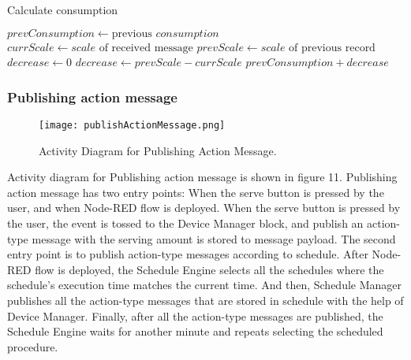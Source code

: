 \documentclass[conference]{IEEEtran}
\begin{document}
\begin{algorithm}
\caption{Calculate consumption}\label{algo}
\begin{algorithmic}[1]
        \State $prevConsumption \gets \text{previous } \textit{consumption}$
        \State $currScale \gets \textit{scale} \text{ of received message}$
        \State $prevScale \gets \textit{scale} \text{ of  previous record}$
        \State $decrease \gets 0$
            \State $decrease \gets prevScale - currScale$
        \EndIf
        \Return $prevConsumption + decrease$
    \EndProcedure
\end{algorithmic}
\end{algorithm}

\subsubsection{Publishing action message}
\begin{figure}[htbp]
\centerline{\texttt{[image: publishActionMessage.png]}}
\caption{Activity Diagram for Publishing Action Message.}
\label{fig}
\end{figure}
Activity diagram for Publishing action message is shown in figure 11. Publishing action message has two entry points: When the serve button is pressed by the user, and when Node-RED flow is deployed. When the serve button is pressed by the user, the event is tossed to the Device Manager block, and publish an action-type message with the serving amount is stored to message payload. The second entry point is to publish action-type messages according to schedule. After Node-RED flow is deployed, the Schedule Engine selects all the schedules where the schedule’s execution time matches the current time. And then, Schedule Manager publishes all the action-type messages that are stored in schedule with the help of Device Manager. Finally, after all the action-type messages are published, the Schedule Engine waits for another minute and repeats selecting the scheduled procedure.

\hfill \break
\end{document}
